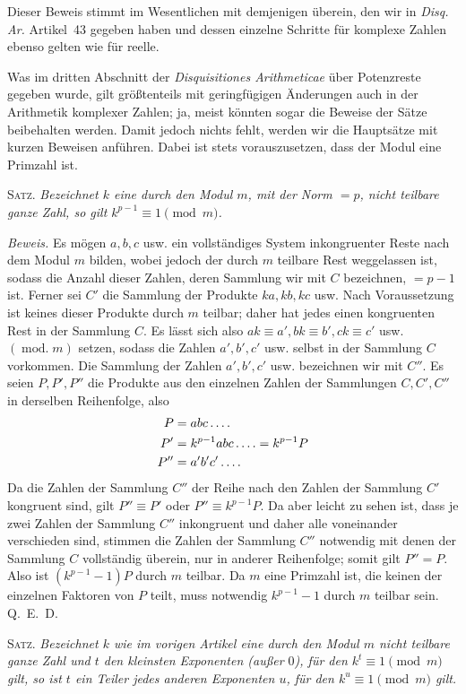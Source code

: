 Dieser Beweis stimmt im Wesentlichen mit demjenigen überein, den wir in \emph{Disq. Ar.} Artikel~43 gegeben haben und dessen einzelne Schritte für komplexe Zahlen ebenso gelten wie für reelle.

%
Was im dritten Abschnitt der \emph{Disquisitiones Arithmeticae} über Potenzreste gegeben wurde, gilt größtenteils mit geringfügigen Änderungen auch in der Arithmetik komplexer Zahlen; ja, meist könnten sogar die Beweise der Sätze beibehalten werden. Damit jedoch nichts fehlt, werden wir die Hauptsätze mit kurzen Beweisen anführen. Dabei ist stets vorauszusetzen, dass der Modul eine Primzahl ist.

\textsc{Satz.} \emph{Bezeichnet $k$ eine durch den Modul $m$, mit der Norm $=p$, nicht teilbare ganze Zahl, so gilt $k^{p-1}\equiv1\pmod m$.}

\emph{Beweis.} Es mögen $a,b,c$ usw. ein vollständiges System inkongruenter Reste nach dem Modul $m$ bilden, wobei jedoch der durch $m$ teilbare Rest weggelassen ist, sodass die Anzahl dieser Zahlen, deren Sammlung wir mit $C$ bezeichnen, $=p-1$ ist. Ferner sei $C'$ die Sammlung der Produkte $ka,kb,kc$ usw. Nach Voraussetzung ist keines dieser Produkte durch $m$ teilbar; daher hat jedes einen kongruenten Rest in der Sammlung $C$. Es lässt sich also $ak\equiv a',bk\equiv b',ck\equiv c'$ usw. $(\operatorname{mod.}m)$ setzen, sodass die Zahlen $a',b',c'$ usw. selbst in der Sammlung $C$ vorkommen. Die Sammlung der Zahlen $a',b',c'$ usw. bezeichnen wir mit $C''$. Es seien $P,P',P''$ die Produkte aus den einzelnen Zahlen der Sammlungen $C,C',C''$ in derselben Reihenfolge, also
\[
\begin{aligned}
P&=abc\mathinner{.\,.\,.\,.}\\
P'&=k^{p-1}abc\mathinner{.\,.\,.\,.}=k^{p-1}P\\
P''&=a'b'c'\mathinner{.\,.\,.\,.}
\end{aligned}
\]
Da die Zahlen der Sammlung $C''$ der Reihe nach den Zahlen der Sammlung $C'$ kongruent sind, gilt $P''\equiv P'$ oder $P''\equiv k^{p-1}P$. Da aber leicht zu sehen ist, dass je zwei Zahlen der Sammlung $C''$ inkongruent und daher alle voneinander verschieden sind, stimmen die Zahlen der Sammlung $C''$ notwendig mit denen der Sammlung $C$ vollständig überein, nur in anderer Reihenfolge; somit gilt $P''=P$. Also ist $(k^{p-1}-1)P$ durch $m$ teilbar. Da $m$ eine Primzahl ist, die keinen der einzelnen Faktoren von $P$ teilt, muss notwendig $k^{p-1}-1$ durch $m$ teilbar sein. Q.~E.~D.

\textsc{Satz.} \emph{Bezeichnet $k$ wie im vorigen Artikel eine durch den Modul $m$ nicht teilbare ganze Zahl und $t$ den kleinsten Exponenten (außer $0$), für den $k^t\equiv1\pmod m$ gilt, so ist $t$ ein Teiler jedes anderen Exponenten $u$, für den $k^u\equiv1\pmod m$ gilt.}

